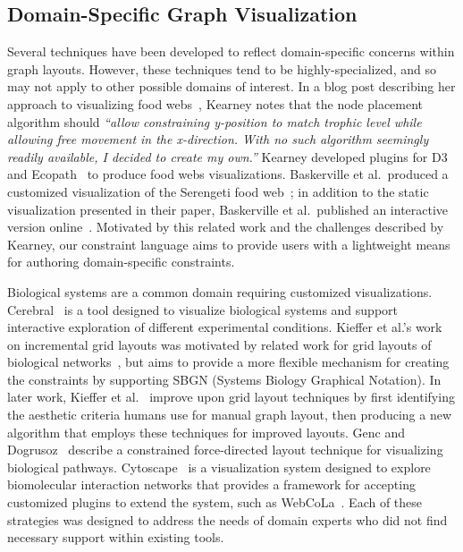 \subsection{Domain-Specific Graph Visualization}
Several techniques have been developed to reflect domain-specific concerns
within graph layouts. However, these techniques
tend to be highly-specialized, and so may not apply to other possible
domains of interest. In a blog post describing her approach to
visualizing food webs~\cite{kearney2016blog}, Kearney notes that the node
placement algorithm should \emph{``allow constraining y-position to match
  trophic level while allowing free movement in the x-direction. With no
  such algorithm seemingly readily available, I decided to create my
  own.''} Kearney developed plugins for D3~\cite{kearney2017d3} and
Ecopath~\cite{kearney2017ecopath} to produce food webs visualizations.
Baskerville et al.\ produced a customized visualization of the Serengeti food web~\cite{baskerville2011spatial}; 
in addition to the static visualization presented in their paper, Baskerville et al.\ 
published an interactive version online~\cite{baskerville2011interactive}. 
Motivated by this related work and the
challenges described by Kearney, our constraint language aims to provide users
with a lightweight means for authoring domain-specific constraints.

Biological systems are a common domain requiring customized visualizations.
Cerebral~\cite{barsky2008cerebral} is a tool designed to visualize
biological systems and support interactive exploration of different
experimental conditions. Kieffer et al.'s work on incremental grid layouts 
was motivated by related work  for grid layouts of biological 
networks~\cite{barsky2008cerebral,kojima2007efficient,li2005grid}, 
but aims to provide a more flexible mechanism for creating the constraints 
by supporting SBGN (Systems Biology Graphical Notation). In later
work, Kieffer et al.~\cite{kieffer2016hola} improve upon grid layout techniques
by first identifying the aesthetic criteria humans use for manual graph layout,
then producing a new algorithm that employs these techniques for improved layouts.
Genc and Dogrusoz~\cite{genc2003constrained}
describe a constrained force-directed layout technique for visualizing 
biological pathways. Cytoscape~\cite{shannon2003cytoscape} is a
visualization system designed to explore biomolecular interaction networks
that provides a framework for accepting customized plugins to extend the
system, such as WebCoLa~\cite{WebCoLa}. Each of these strategies was designed to
address the needs of domain experts who did not find necessary
support within existing tools.

